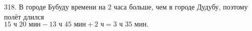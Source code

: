 318. В городе Бубуду времени на 2 часа больше, чем в городе Дудубу, поэтому полёт длился\\ $15\text{ ч }20\text{ мин}-13\text{ ч }45\text{ мин}+2\text{ ч}=3\text{ ч }35\text{ мин}.$\\
